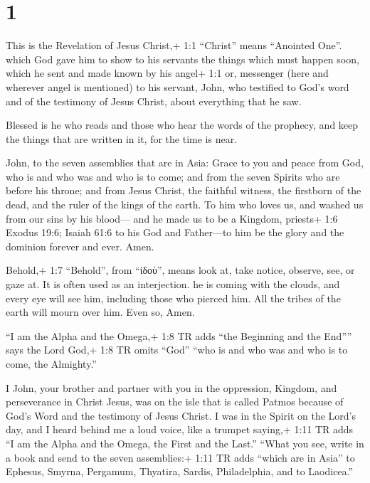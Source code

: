 \hypertarget{section}{%
\section{1}\label{section}}

 This is the Revelation of Jesus Christ,+ 1:1 ``Christ''
means ``Anointed One''. which God gave him to show to his servants the
things which must happen soon, which he sent and made known by his
angel+ 1:1 or, messenger (here and wherever angel is mentioned) to his
servant, John,  who testified to God's word and of the
testimony of Jesus Christ, about everything that he saw.

 Blessed is he who reads and those who hear the words of the
prophecy, and keep the things that are written in it, for the time is
near.

 John, to the seven assemblies that are in Asia: Grace to
you and peace from God, who is and who was and who is to come; and from
the seven Spirits who are before his throne;  and from Jesus
Christ, the faithful witness, the firstborn of the dead, and the ruler
of the kings of the earth. To him who loves us, and washed us from our
sins by his blood---  and he made us to be a Kingdom,
priests+ 1:6 Exodus 19:6; Isaiah 61:6 to his God and Father---to him be
the glory and the dominion forever and ever. Amen.

 Behold,+ 1:7 ``Behold'', from ``ἰδοὺ'', means look at, take
notice, observe, see, or gaze at. It is often used as an interjection.
he is coming with the clouds, and every eye will see him, including
those who pierced him. All the tribes of the earth will mourn over him.
Even so, Amen.

 ``I am the Alpha and the Omega,+ 1:8 TR adds ``the
Beginning and the End'''' says the Lord God,+ 1:8 TR omits ``God'' ``who
is and who was and who is to come, the Almighty.''

 I John, your brother and partner with you in the
oppression, Kingdom, and perseverance in Christ Jesus, was on the isle
that is called Patmos because of God's Word and the testimony of Jesus
Christ.  I was in the Spirit on the Lord's day, and I heard
behind me a loud voice, like a trumpet  saying,+ 1:11 TR
adds ``I am the Alpha and the Omega, the First and the Last.'' ``What
you see, write in a book and send to the seven assemblies:+ 1:11 TR adds
``which are in Asia'' to Ephesus, Smyrna, Pergamum, Thyatira, Sardis,
Philadelphia, and to Laodicea.''

